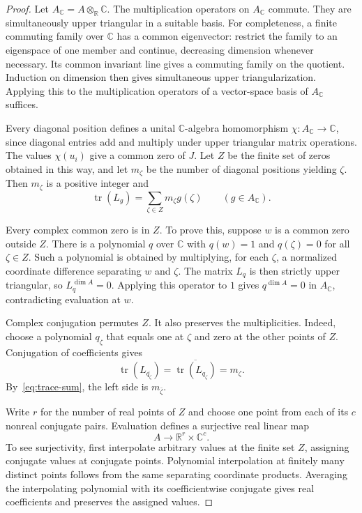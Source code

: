 \documentclass[11pt,leqno]{amsart}
\theoremstyle{definition}
\theoremstyle{remark}
\numberwithin{equation}{section}
\newcommand{\R}{\mathbb R}
\newcommand{\C}{\mathbb C}
\newcommand{\tr}{\operatorname{tr}}
\begin{document}
\begin{proof}
Let $A_\C=A\otimes_\R\C$. The multiplication operators on $A_\C$
commute. They are simultaneously upper triangular in a suitable basis.
For completeness, a finite commuting family over $\C$ has a common
eigenvector: restrict the family to an eigenspace of one member and
continue, decreasing dimension whenever necessary. Its common invariant
line gives a commuting family on the quotient. Induction on dimension
then gives simultaneous upper triangularization. Applying this to the
multiplication operators of a vector-space basis of $A_\C$ suffices.

Every diagonal position defines a unital $\C$-algebra homomorphism
$\chi:A_\C\to\C$, since diagonal entries add and multiply under upper
triangular matrix operations. The values $\chi(u_i)$ give a common zero
of $J$. Let $Z$ be the finite set of zeros obtained in this way, and
let $m_\zeta$ be the number of diagonal positions yielding $\zeta$.
Then $m_\zeta$ is a positive integer and
\begin{equation}\label{eq:trace-sum}
 \tr(L_g)=\sum_{\zeta\in Z}m_\zeta g(\zeta)
 \qquad(g\in A_\C).
\end{equation}

Every complex common zero is in $Z$. To prove this, suppose $w$ is
a common zero outside $Z$. There is a polynomial $q$ over $\C$
with $q(w)=1$ and $q(\zeta)=0$ for all $\zeta\in Z$. Such a polynomial
is obtained by multiplying, for each $\zeta$, a normalized coordinate
difference separating $w$ and $\zeta$. The matrix $L_q$ is then strictly
upper triangular, so $L_q^{\dim A}=0$. Applying this operator to $1$
gives $q^{\dim A}=0$ in $A_\C$, contradicting evaluation at $w$.

Complex conjugation permutes $Z$. It also preserves the multiplicities.
Indeed, choose a polynomial $q_\zeta$ that equals one at $\zeta$ and
zero at the other points of $Z$. Conjugation of coefficients gives
\[
 \tr(L_{\overline{q_\zeta}})
 =\overline{\tr(L_{q_\zeta})}=m_\zeta.
\]
By~\eqref{eq:trace-sum}, the left side is $m_{\bar\zeta}$.

Write $r$ for the number of real points of $Z$ and choose one point
from each of its $c$ nonreal conjugate pairs. Evaluation defines a
surjective real linear map
\begin{equation}\label{eq:evaluation}
 A\longrightarrow\R^r\times\C^c.
\end{equation}
To see surjectivity, first interpolate arbitrary values at the finite
set $Z$, assigning conjugate values at conjugate points. Polynomial
interpolation at finitely many distinct points follows from the same
separating coordinate products. Averaging the interpolating polynomial
with its coefficientwise conjugate gives real coefficients and
preserves the assigned values.


\end{proof}
\end{document}
